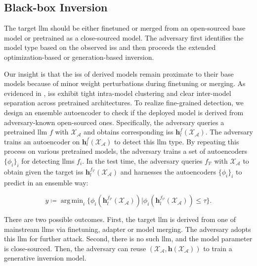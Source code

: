 \documentclass[letterpaper,twocolumn,10pt]{article}
\newcommand{\llm}{f}
\newcommand{\interstatesalone}{\bh}
\newcommand{\interstates}[2]{\bh^{#1}_{#2}}
\newcommand{\advdata}{\cX_\cA}
\newcommand{\bheading}[1]{{\vspace{4pt}\noindent{\textbf{#1}}}}
\newcommand{\bh}{\mathbf{h}}
\newcommand{\cA}{\mathcal{A}}
\newcommand{\cV}{\mathcal{V}}
\newcommand{\cX}{\mathcal{X}}
\DeclareMathOperator*{\argmin}{arg\,min}
\theoremstyle{definition}
\begin{document}
\subsection{Black-box Inversion}
\label{sec:black-box}
The target \ac{llm} should be either finetuned or merged from an open-sourced base model or pretrained as a close-sourced model.
The adversary first identifies the model type based on the observed \acp{is} and then proceeds the extended optimization-based or generation-based inversion.







\bheading{Model Type Identification.}
Our insight is that the \acp{is} of derived models remain proximate to their base models because of minor weight perturbations during finetuning or merging.
As evidenced in , \acp{is} exhibit tight intra-model clustering and clear inter-model separation across pretrained architectures.
To realize fine-grained detection, we design an ensemble autoencoder to check if the deployed model is derived from adversary-known open-sourced ones.
Specifically, the adversary queries a pretrained \ac{llm} $\llm$ with $\advdata$ and obtains corresponding \acp{is} $\interstates{\llm}{l}(\advdata)$.
The adversary trains an autoencoder on $\interstates{\llm}{l}(\advdata)$ to detect this \ac{llm} type.
By repeating this process on various pretrained models, the adversary trains a set of autoencoders $\{\phi_i\}_i$ for detecting \acp{llm} $\llm_i$.
In the test time, the adversary queries $\llm_\cV$ with $\cX_\cA$ to obtain given the target \acp{is} $\interstates{\llm_\cV}{l}(\cX_\cA)$ and harnesses the autoencoders $\{\phi_i\}_i$ to predict in an ensemble way:

\begin{equation}
    y\coloneqq\argmin_{i}\{\phi_i(\interstates{\llm_\cV}{l}(\cX_\cA))| \phi_i(\interstates{\llm_\cV}{l}(\cX_\cA)) \leq \tau\}.
\end{equation}






There are two possible outcomes.
First, the target \ac{llm} is derived from one of mainstream \acp{llm} via finetuning, adapter or model merging.
The adversary adopts this \ac{llm} for further attack. 
Second, there is no such \ac{llm}, and the model parameter is close-sourced.
Then, the adversary can reuse $(\advdata, \interstatesalone(\advdata))$ to train a generative inversion model.
\end{document}
